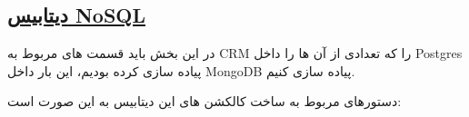 \subsection*{\underline{دیتابیس NoSQL}}

در این بخش باید قسمت های مربوط به CRM را که تعدادی از آن ها را داخل Postgres پیاده سازی کرده بودیم، این بار داخل MongoDB پیاده سازی کنیم.

دستورهای مربوط به ساخت کالکشن های این دیتابیس به این صورت است:
